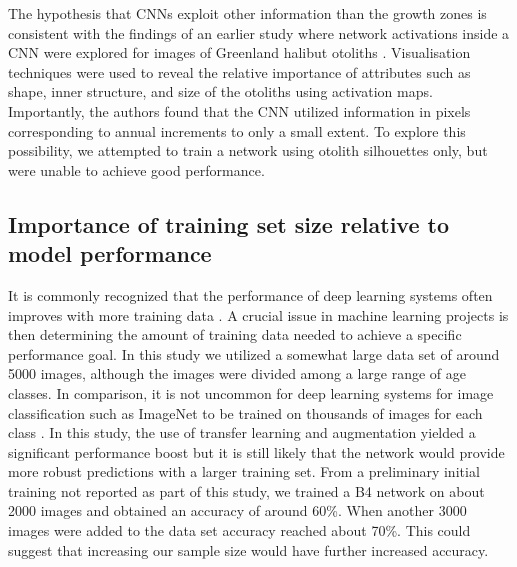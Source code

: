 \documentclass[10pt,letterpaper]{article}
\begin{document}
The hypothesis that CNNs exploit other information than the growth zones is consistent with the findings of an earlier study where network activations inside a CNN were explored for images of Greenland halibut otoliths \citep{ordonez2020explaining}. Visualisation techniques were used to reveal the relative importance of attributes such as shape, inner structure, and size of the otoliths using activation maps. Importantly, the authors found that the CNN utilized information in pixels corresponding to annual increments to only a small extent.  To explore this possibility, we attempted to train a network using otolith silhouettes only, but were unable to achieve good performance.

\subsection{Importance of training set size relative to model performance}

It is commonly recognized that the performance of deep learning systems often improves with more training data \citep{lecun2015deep}. A crucial issue in machine learning projects is then determining the amount of training data needed to achieve a specific performance goal. In this study we utilized a somewhat large data set of around 5000 images, although the images were divided among a large range of age classes. In comparison, it is not uncommon for deep learning systems for image classification such as ImageNet to be trained on thousands of images for each class \citep{Russakovsky2015}. In this study, the use of transfer learning \citep{NIPS2014_5347} and augmentation yielded a significant performance boost but it is still likely that the network would provide more robust predictions with a larger training set. From a preliminary initial training not reported as part of this study, we trained a B4 network on about 2000 images and obtained an accuracy of around 60\%. When another 3000 images were added to the data set accuracy reached about 70\%. This could suggest that increasing our sample size would have further increased accuracy.
\end{document}

